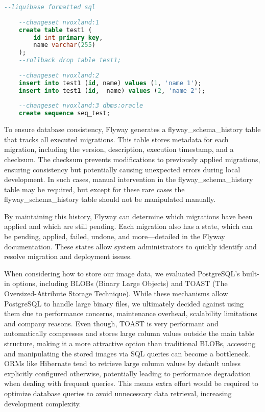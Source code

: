 \begin{lstlisting}[language=Sql,caption=Liquibase example changelog,label=lst:liquibase:example]
    --liquibase formatted sql
    
    --changeset nvoxland:1
    create table test1 (  
        id int primary key,
        name varchar(255)  
    );  
    --rollback drop table test1; 
    
    --changeset nvoxland:2 
    insert into test1 (id, name) values (1, 'name 1');
    insert into test1 (id,  name) values (2, 'name 2');  
    
    --changeset nvoxland:3 dbms:oracle
    create sequence seq_test;
\end{lstlisting}
    
To ensure database consistency, Flyway generates a flyway\_schema\_history table that tracks all executed migrations. This table stores metadata for each migration, including the version, description, execution timestamp, and a checksum. The checksum prevents modifications to previously applied migrations, ensuring consistency but potentially causing unexpected errors during local development. In such cases, manual intervention in the flyway\_schema\_history table may be required, but except for these rare cases the flyway\_schema\_history table should not be manipulated manually.

By maintaining this history, Flyway can determine which migrations have been applied and which are still pending. Each migration also has a state, which can be pending, applied, failed, undone, and more—detailed in the Flyway documentation. These states allow system administrators to quickly identify and resolve migration and deployment issues.

When considering how to store our image data, we evaluated PostgreSQL’s built-in options, including BLOBs (Binary Large Objects) and TOAST (The Oversized-Attribute Storage Technique). While these mechanisms allow PostgreSQL to handle large binary files, we ultimately decided against using them due to performance concerns, maintenance overhead, scalability limitations and company reasons.
Even though, TOAST is very performant and automatically compresses and stores large column values outside the main table structure, making it a more attractive option than traditional BLOBs, accessing and manipulating the stored images via SQL queries can become a bottleneck. ORMs like Hibernate tend to retrieve large column values by default unless explicitly configured otherwise, potentially leading to performance degradation when dealing with frequent queries. This means extra effort would be required to optimize database queries to avoid unnecessary data retrieval, increasing development complexity.


